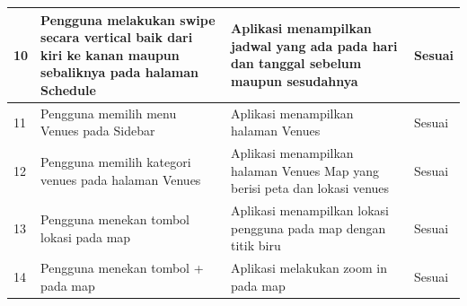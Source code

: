 \begin{table}[H]
\begin{tabular}{|p{0.3cm}|p{5.7cm}|p{5.7cm}|p{3cm}|}
10 & Pengguna melakukan swipe secara vertical baik dari kiri ke kanan maupun sebaliknya pada halaman Schedule & Aplikasi menampilkan jadwal yang ada pada hari dan tanggal sebelum maupun sesudahnya & Sesuai                 \\ \hline
11 & Pengguna memilih menu Venues pada Sidebar                                          & Aplikasi menampilkan halaman Venues                                                  & Sesuai                 \\ \hline
12 & Pengguna memilih kategori venues pada halaman Venues                               & Aplikasi menampilkan halaman Venues Map yang berisi peta dan lokasi venues           & Sesuai                 \\ \hline
13 & Pengguna menekan tombol lokasi pada map                                            & Aplikasi menampilkan lokasi pengguna pada map dengan titik biru                      & Sesuai                 \\ \hline
14 & Pengguna menekan tombol + pada map                                                 & Aplikasi melakukan zoom in pada map                                                  & Sesuai                 \\ \hline
\end{tabular}
\end{table}

